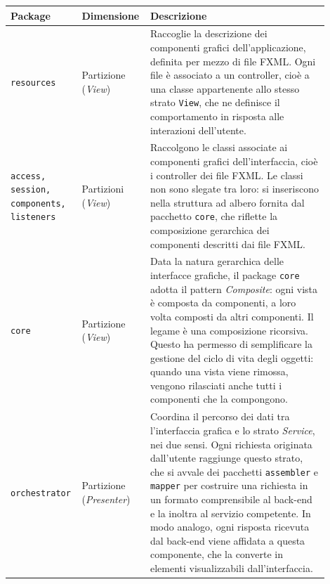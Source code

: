 \begin{center}
	\vspace*{-1em}
\def\arraystretch{2.0}
\begin{tabular}{|p{0.17\linewidth}|p{0.18\linewidth}|p{0.55\linewidth}|}
\hline
\textbf{Package} & \textbf{Dimensione} & \textbf{Descrizione} \\
\hline 
\texttt{resources} & Partizione (\textit{View}) & Raccoglie la descrizione dei componenti grafici 
dell'applicazione, definita per mezzo di file FXML. Ogni file è associato 
a un controller, cioè a una classe appartenente allo stesso strato \texttt{View}, 
che ne definisce il comportamento in risposta alle interazioni dell’utente. \\
\hline
\texttt{access, session, components, listeners} & Partizioni (\textit{View}) & Raccolgono le 
classi associate ai componenti grafici dell’interfaccia, cioè i controller 
dei file FXML. Le classi non sono slegate tra loro: si inseriscono nella 
struttura ad albero fornita dal pacchetto \texttt{core}, che riflette 
la composizione gerarchica dei componenti descritti dai file FXML. \\ 
\hline
\texttt{core} & Partizione (\textit{View}) & Data la natura gerarchica 
delle interfacce grafiche, il package \texttt{core} adotta il pattern 
\textit{Composite}: ogni vista è composta da componenti, a loro volta 
composti da altri componenti. Il legame è una composizione ricorsiva. 
Questo ha permesso di semplificare la gestione del ciclo di vita degli 
oggetti: quando una vista viene rimossa, vengono rilasciati anche tutti 
i componenti che la compongono. \\
\hline
\texttt{orchestrator} & Partizione (\textit{Presenter}) & Coordina il percorso dei dati tra 
l’interfaccia grafica e lo strato \textit{Service}, nei due 
sensi. Ogni richiesta originata dall’utente raggiunge questo strato, 
che si avvale dei pacchetti \texttt{assembler} e \texttt{mapper} per costruire una 
richiesta in un formato comprensibile al back-end e la inoltra al 
servizio competente. In modo analogo, ogni risposta ricevuta dal 
back-end viene affidata a questa componente, che la 
converte in elementi visualizzabili dall’interfaccia. \\

\end{tabular} 
\end{center}

